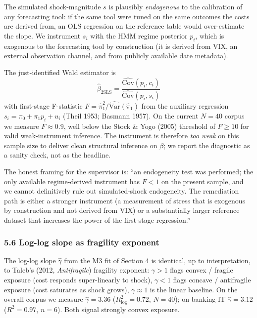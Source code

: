 \documentclass[
]{article}
\begin{document}
The simulated shock-magnitude \(s\) is plausibly \emph{endogenous} to
the calibration of any forecasting tool: if the same tool were tuned on
the same outcomes the costs are derived from, an OLS regression on the
reference table would over-estimate the slope. We instrument \(s_i\)
with the HMM regime posterior \(p_i\), which is exogenous to the
forecasting tool by construction (it is derived from VIX, an external
observation channel, and from publicly available date metadata).

The just-identified Wald estimator is \[
\hat{\beta}_{\text{2SLS}} = \frac{\widehat{\text{Cov}}(p_i, c_i)}{\widehat{\text{Cov}}(p_i, s_i)}
\] with first-stage F-statistic
\(F = \hat{\pi}_1^2 / \widehat{\text{Var}}(\hat{\pi}_1)\) from the
auxiliary regression \(s_i = \pi_0 + \pi_1 p_i + u_i\) (Theil 1953;
Basmann 1957). On the current \(N=40\) corpus we measure
\(F \approx 0.9\), well below the Stock \& Yogo (2005) threshold of
\(F \geq 10\) for valid weak-instrument inference. The instrument is
therefore \emph{too weak} on this sample size to deliver clean
structural inference on \(\beta\); we report the diagnostic as a sanity
check, not as the headline.

The honest framing for the supervisor is: ``an endogeneity test was
performed; the only available regime-derived instrument has \(F < 1\) on
the present sample, and we cannot definitively rule out simulated-shock
endogeneity. The remediation path is either a stronger instrument (a
measurement of stress that is exogenous by construction and not derived
from VIX) or a substantially larger reference dataset that increases the
power of the first-stage regression.''

\subsubsection{5.6 Log-log slope as fragility
exponent}\label{log-log-slope-as-fragility-exponent}

The log-log slope \(\hat{\gamma}\) from the M3 fit of Section 4 is
identical, up to interpretation, to Taleb's (2012, \emph{Antifragile})
fragility exponent: \(\gamma > 1\) flags convex / fragile exposure (cost
responds super-linearly to shock), \(\gamma < 1\) flags concave /
antifragile exposure (cost saturates as shock grows),
\(\gamma \approx 1\) is the linear baseline. On the overall corpus we
measure \(\hat{\gamma} = 3.36\) (\(R^2_{\log} = 0.72\), \(N = 40\)); on
banking-IT \(\hat{\gamma} = 3.12\) (\(R^2 = 0.97\), \(n = 6\)). Both
signal strongly convex exposure.
\end{document}
